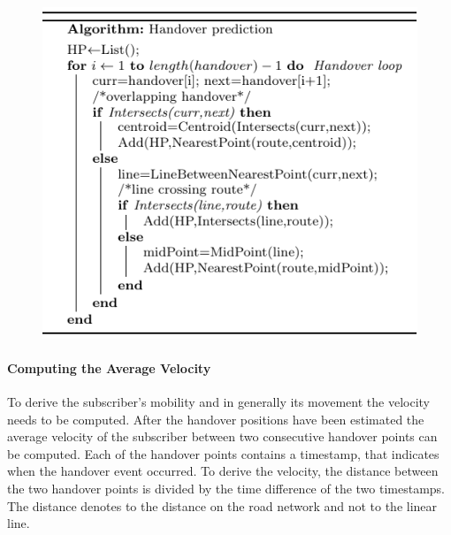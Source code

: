 \begin{figure}
\centering
\includegraphics{./predictionalg}
\caption{}
\label{alg:prediction}
\end{figure}

\paragraph{Computing the Average Velocity}
To derive the subscriber's mobility and in generally its movement the velocity needs to be computed. 
After the handover positions have been estimated the average velocity of the subscriber between two consecutive handover points can be computed. 
Each of the handover points contains a timestamp, that indicates when the handover event occurred. To derive the velocity, the distance between the two handover points is divided by the time difference of the two timestamps. The distance denotes to the distance on the road network and not to the linear line. 

